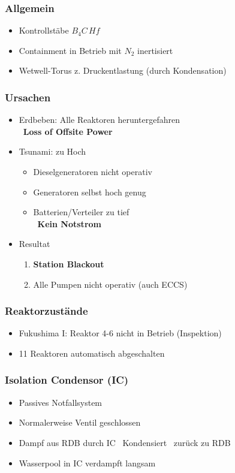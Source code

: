 \documentclass[12pt]{article}
\begin{document}
\subsubsection{Allgemein}
\begin{itemize}
  \item Kontrollstäbe \(B_4C\, Hf\)
  \item Containment in Betrieb mit \(N_2\) inertisiert
  \item Wetwell-Torus z. Druckentlastung (durch Kondensation)
\end{itemize}

\subsubsection{Ursachen}
\begin{itemize}
  \item Erdbeben: Alle Reaktoren heruntergefahren\\
  \textrightarrow\ \textbf{Loss of Offsite Power}
  \item Tsunami: zu Hoch
  \begin{itemize}
    \item Dieselgeneratoren nicht operativ
    \item Generatoren selbst hoch genug
    \item Batterien/Verteiler zu tief\\
    \textrightarrow\ \textbf{Kein Notstrom}
  \end{itemize}
  \item Resultat
  \begin{enumerate}[label = \textrightarrow]
  \item \textbf{Station Blackout}
  \item Alle Pumpen nicht operativ (auch ECCS)
  \end{enumerate}
\end{itemize}

\subsubsection{Reaktorzustände}
\begin{itemize}
  \item Fukushima I: Reaktor 4-6 nicht in Betrieb (Inspektion)
  \item 11 Reaktoren automatisch abgeschalten
\end{itemize}

\subsubsection{Isolation Condensor (IC)}
\begin{itemize}
  \item Passives Notfallsystem
  \item Normalerweise Ventil geschlossen
  \item Dampf aus RDB durch IC \textrightarrow\ Kondensiert \textrightarrow\ zurück zu RDB
  \item Wasserpool in IC verdampft langsam
\end{itemize}
\end{document}
